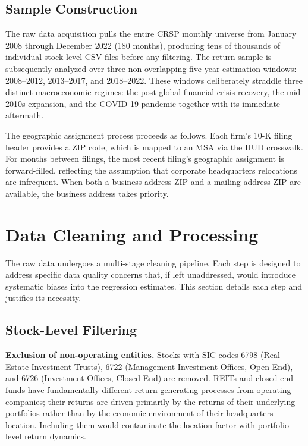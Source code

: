 \documentclass[
  12pt,
]{article}
\begin{document}
\subsection{Sample Construction}\label{sample-construction}

The raw data acquisition pulls the entire CRSP monthly universe from
January 2008 through December 2022 (180 months), producing tens of
thousands of individual stock-level CSV files before any filtering. The
return sample is subsequently analyzed over three non-overlapping
five-year estimation windows: 2008--2012, 2013--2017, and 2018--2022.
These windows deliberately straddle three distinct macroeconomic
regimes: the post-global-financial-crisis recovery, the mid-2010s
expansion, and the COVID-19 pandemic together with its immediate
aftermath.

The geographic assignment process proceeds as follows. Each firm's 10-K
filing header provides a ZIP code, which is mapped to an MSA via the HUD
crosswalk. For months between filings, the most recent filing's
geographic assignment is forward-filled, reflecting the assumption that
corporate headquarters relocations are infrequent. When both a business
address ZIP and a mailing address ZIP are available, the business
address takes priority.

\section{Data Cleaning and
Processing}\label{data-cleaning-and-processing}

The raw data undergoes a multi-stage cleaning pipeline. Each step is
designed to address specific data quality concerns that, if left
unaddressed, would introduce systematic biases into the regression
estimates. This section details each step and justifies its necessity.

\subsection{Stock-Level Filtering}\label{stock-level-filtering}

\textbf{Exclusion of non-operating entities.} Stocks with SIC codes 6798
(Real Estate Investment Trusts), 6722 (Management Investment Offices,
Open-End), and 6726 (Investment Offices, Closed-End) are removed. REITs
and closed-end funds have fundamentally different return-generating
processes from operating companies; their returns are driven primarily
by the returns of their underlying portfolios rather than by the
economic environment of their headquarters location. Including them
would contaminate the location factor with portfolio-level return
dynamics.
\end{document}
